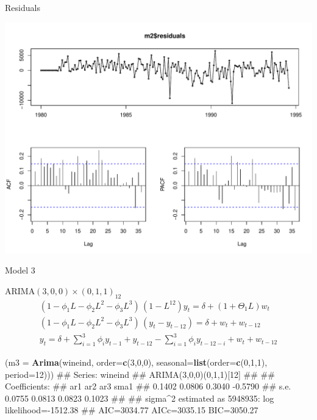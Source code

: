\documentclass[11pt,ignorenonframetext,]{beamer}
\newenvironment{Shaded}{}{}
\newcommand{\KeywordTok}[1]{\textcolor[rgb]{0.00,0.44,0.13}{\textbf{#1}}}
\newcommand{\DataTypeTok}[1]{\textcolor[rgb]{0.56,0.13,0.00}{#1}}
\newcommand{\DecValTok}[1]{\textcolor[rgb]{0.25,0.63,0.44}{#1}}
\newcommand{\NormalTok}[1]{#1}
\let\oldShaded\Shaded
\let\endoldShaded\endShaded
\renewenvironment{Shaded}{\footnotesize\begin{spacing}{0.9}\oldShaded}{\endoldShaded\end{spacing}}
\begin{document}
\begin{frame}{Residuals}

\includegraphics{Lec11_files/figure-beamer/unnamed-chunk-8-1.pdf}

\end{frame}

\begin{frame}[fragile]{Model 3}

\(\text{ARIMA}(3,0,0) \times (0,1,1)_{12}\) \[
\begin{aligned}
(1-\phi_1 L - \phi_2 L^2 - \phi_3 L^3) \, (1-L^{12}) y_t = \delta + (1 + \Theta_1 L)w_t \\
(1-\phi_1 L - \phi_2 L^2 - \phi_3 L^3) \, (y_t-y_{t-12}) = \delta + w_t + w_{t-12} \\
y_t = \delta + \sum_{i=1}^3 \phi_i y_{t-1}  + y_{t-12}  - \sum_{i=1}^3 \phi_i y_{t-12-i} + w_t + w_{t-12}
\end{aligned}
\]

\begin{Shaded}
\begin{Highlighting}[]
\NormalTok{(}\DataTypeTok{m3 =} \KeywordTok{Arima}\NormalTok{(wineind, }\DataTypeTok{order=}\KeywordTok{c}\NormalTok{(}\DecValTok{3}\NormalTok{,}\DecValTok{0}\NormalTok{,}\DecValTok{0}\NormalTok{), }
            \DataTypeTok{seasonal=}\KeywordTok{list}\NormalTok{(}\DataTypeTok{order=}\KeywordTok{c}\NormalTok{(}\DecValTok{0}\NormalTok{,}\DecValTok{1}\NormalTok{,}\DecValTok{1}\NormalTok{), }\DataTypeTok{period=}\DecValTok{12}\NormalTok{)))}
\NormalTok{## Series: wineind }
\NormalTok{## ARIMA(3,0,0)(0,1,1)[12]                    }
\NormalTok{## }
\NormalTok{## Coefficients:}
\NormalTok{##          ar1     ar2     ar3     sma1}
\NormalTok{##       0.1402  0.0806  0.3040  -0.5790}
\NormalTok{## s.e.  0.0755  0.0813  0.0823   0.1023}
\NormalTok{## }
\NormalTok{## sigma^2 estimated as 5948935:  log likelihood=-1512.38}
\NormalTok{## AIC=3034.77   AICc=3035.15   BIC=3050.27}
\end{Highlighting}
\end{Shaded}

\end{frame}
\end{document}
